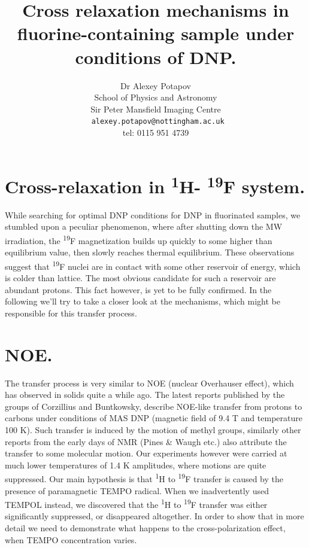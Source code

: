 \documentclass[a4paper, 12pt]{article}
\begin{document}
\title{Cross relaxation mechanisms in fluorine-containing sample under conditions of DNP.}
\author{Dr Alexey Potapov\\
School of Physics and Astronomy\\
Sir Peter Mansfield Imaging Centre \\
\texttt{ alexey.potapov@nottingham.ac.uk}\\
tel: 0115 951 4739 }
\maketitle
 
\doublespacing
 
\section{Cross-relaxation in \textsuperscript{1}H- \textsuperscript{19}F system.}
While searching for optimal DNP conditions for DNP in fluorinated samples, we stumbled upon a peculiar phenomenon, where after shutting down the MW irradiation, the \textsuperscript{19}F magnetization builds up quickly to some higher than equilibrium value, then slowly reaches thermal equilibrium. These observations suggest that \textsuperscript{19}F nuclei are in contact with some other reservoir of energy, which is colder than lattice. The most obvious candidate for such a reservoir are abundant protons. This fact however, is yet to be fully confirmed.  
In the following we'll try to take a closer look at the mechanisms, which might be responsible for this transfer process.
\section{NOE.}
The transfer process is very similar to NOE (nuclear Overhauser effect), which has observed in solids quite a while ago. The latest reports published by the groups of Corzillius and Buntkowsky, describe NOE-like transfer from protons to carbons under conditions of MAS DNP (magnetic field of 9.4 T and temperature 100 K). Such transfer is induced by the motion of methyl groups, similarly other reports from the early days of NMR (Pines \& Waugh etc.) also attribute the transfer to some molecular motion. Our experiments however were carried at much lower temperatures of 1.4 K amplitudes, where motions are quite suppressed. 
Our main hypothesis is that \textsuperscript{1}H to \textsuperscript{19}F transfer is caused by the presence of paramagnetic TEMPO radical. When we inadvertently used  TEMPOL instead, we discovered that the \textsuperscript{1}H to \textsuperscript{19}F transfer was either significantly suppressed, or disappeared altogether. In order to show that in more detail we need to demonstrate what happens to the cross-polarization effect, when TEMPO concentration varies.
\end{document}
